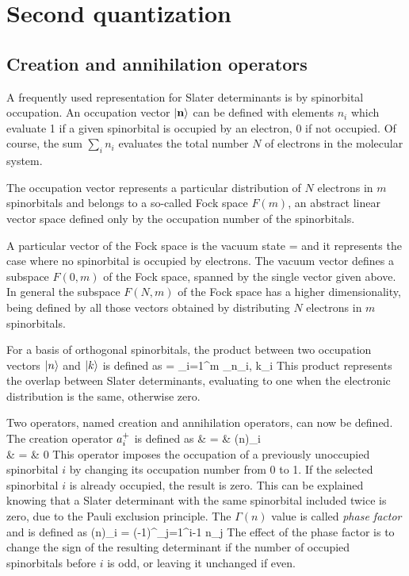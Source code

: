 \section{Second quantization}

\subsection*{Creation and annihilation operators}

A frequently used representation for Slater determinants is by
spinorbital occupation. An occupation vector $\left| \mathbf{n} \right\rangle$ can be defined with elements
$n_i$ which evaluate 1 if a given spinorbital is occupied by an electron, 0
if not occupied. Of course, the sum $\sum_{i} n_i$ evaluates the total
number $N$ of electrons in the molecular system. 

The occupation vector
represents a particular distribution of $N$ electrons in $m$ spinorbitals
and belongs to a so-called Fock space $F(m)$, an abstract linear vector
space defined only by the occupation number of the spinorbitals.

A particular vector of the Fock space is the vacuum state
\beq
\vacuum = 
\eeq
and it represents the case where no spinorbital is occupied by electrons. The
vacuum vector defines a subspace $F(0,m)$ of the Fock space, spanned by the
single vector given above. In general the subspace $F(N,m)$ of the
Fock space has a higher dimensionality, being defined by all those vectors
obtained by distributing $N$ electrons in $m$ spinorbitals.

For a basis of orthogonal spinorbitals, the product between two occupation
vectors $\left| n \right\rangle$ and $\left| k \right\rangle$ is defined as
\beq
{} = \prod_{i=1}^{m} \delta_{n_{i}, k_{i}}
\eeq
This product represents the overlap between Slater determinants, evaluating to
one when the electronic distribution is the same, otherwise zero.

Two operators, named creation and annihilation operators, can now be defined.
The creation operator $a_{i}^{+}$ is defined as 
\beqa
{}  & = &
\Gamma\left(n\right)_i  \\
  & = & 0
\eeqa
This operator imposes the occupation of a previously unoccupied spinorbital
$i$ by changing its occupation number from 0 to 1. If the selected
spinorbital $i$ is already occupied, the result is zero.  This can be
explained knowing that a Slater determinant with the same spinorbital
included twice is zero, due to the Pauli exclusion principle.  The
$\Gamma\left(n\right)$ value is called \textit{phase factor} and is
defined as
\beq
\Gamma\left(n\right)_i = (-1)^{\sum_{j=1}^{i-1} n_j}
\eeq
The effect of the phase factor is to change the sign of the resulting
determinant if the number of occupied spinorbitals before $i$ is odd, or
leaving it unchanged if even.


